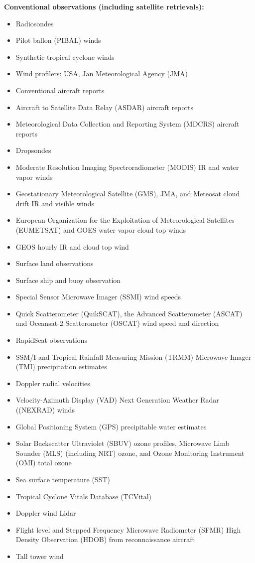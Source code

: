 \textbf{Conventional observations (including satellite retrievals):}
\begin{itemize}
\item Radiosondes
\item Pilot ballon (PIBAL) winds
\item Synthetic tropical cyclone winds
\item Wind profilers: USA, Jan Meteorological Agency (JMA)
\item Conventional aircraft reports
\item Aircraft to Satellite Data Relay (ASDAR) aircraft reports
\item Meteorological Data Collection and Reporting System (MDCRS) aircraft reports
\item Dropsondes
\item Moderate Resolution Imaging Spectroradiometer (MODIS) IR and water vapor winds
\item Geostationary Meteorological Satellite (GMS), JMA, and Meteosat cloud drift IR and visible winds 
\item European Organization for the Exploitation of Meteorological Satellites (EUMETSAT) and GOES water vapor cloud top winds
\item GEOS hourly IR and cloud top wind
\item Surface land observations
\item Surface ship and buoy observation
\item Special Sensor Microwave Imager (SSMI) wind speeds
\item Quick Scatterometer (QuikSCAT), the Advanced Scatterometer (ASCAT) and Oceansat-2 Scatterometer (OSCAT) wind speed and direction
\item RapidScat observations
\item SSM/I and Tropical Rainfall Measuring Mission (TRMM) Microwave Imager (TMI) precipitation estimates
\item Doppler radial velocities
\item Velocity-Azimuth Display (VAD) Next Generation Weather Radar ((NEXRAD) winds
\item Global Positioning System (GPS) precipitable water estimates
\item Solar Backscatter Ultraviolet (SBUV) ozone profiles, Microwave Limb Sounder (MLS) (including NRT) ozone, and Ozone Monitoring Instrument (OMI) total ozone
\item Sea surface temperature (SST)
\item Tropical Cyclone Vitals Database (TCVital)
\item Doppler wind Lidar
\item Flight level and Stepped Frequency Microwave Radiometer (SFMR) High Density
Observation (HDOB) from reconnaissance aircraft
\item Tall tower wind
\end{itemize}


